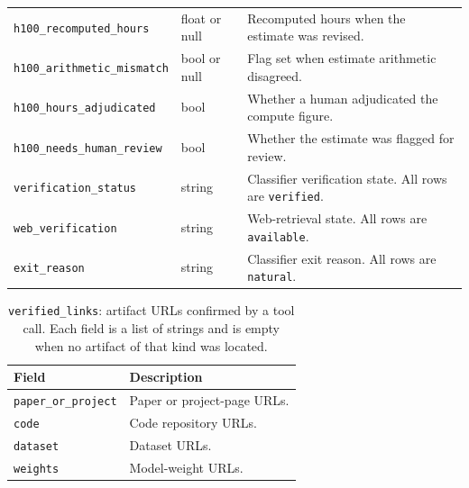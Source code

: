 \begin{table}[t]
\begin{center}
\begin{tabular}{@{}lll@{}}
\texttt{h100\_recomputed\_hours} & float or null & Recomputed hours when the estimate was revised. \\
\texttt{h100\_arithmetic\_mismatch} & bool or null & Flag set when estimate arithmetic disagreed. \\
\texttt{h100\_hours\_adjudicated} & bool & Whether a human adjudicated the compute figure. \\
\texttt{h100\_needs\_human\_review} & bool & Whether the estimate was flagged for review. \\
\texttt{verification\_status} & string & Classifier verification state. All rows are \texttt{verified}. \\
\texttt{web\_verification} & string & Web-retrieval state. All rows are \texttt{available}. \\
\texttt{exit\_reason} & string & Classifier exit reason. All rows are \texttt{natural}. \\
\bottomrule
\end{tabular}
\end{center}
\end{table}

\begin{table}[t]
\caption{\texttt{verified\_links}: artifact URLs confirmed by a tool call. Each
field is a list of strings and is empty when no artifact of that kind was
located.}
\label{tab:schema-links}
\begin{center}
\small
\begin{tabular}{@{}ll@{}}
\toprule
Field & Description \\
\midrule
\texttt{paper\_or\_project} & Paper or project-page URLs. \\
\texttt{code} & Code repository URLs. \\
\texttt{dataset} & Dataset URLs. \\
\texttt{weights} & Model-weight URLs. \\
\bottomrule
\end{tabular}
\end{center}
\end{table}


